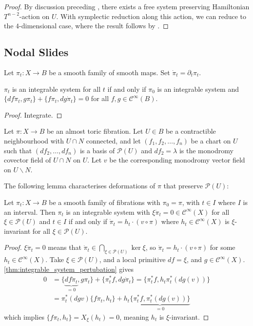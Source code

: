 \documentclass[12pt,a4paper,abstract=true,draft]{scrartcl}
\begin{document}
\begin{proof}
  By discussion preceding \cite[Definition 5.3]{Zun96}, there exists a free system preserving Hamiltonian $T^{n-2}$-action on $U$.
  With symplectic reduction along this action, we can reduce to the $4$-dimensional case, where the result follows by \cite[Lemma 1]{Zun97}.
\end{proof}

\subsection{Nodal Slides}

Let $π_t \colon X → B$ be a smooth family of smooth maps.
Set $\dot{π}_t = ∂_t π_t$.
\begin{lemma}
  \label{thm:integrable_system_pertubation}
  $π_t$ is an integrable system for all $t$ if and only if $π_0$ is an integrable system and $\{df \dot{π}_t,gπ_t\} + \{f π_t, dg \dot{π}_t\} = 0$ for all $f,g ∈ 𝒞^∞(B)$.
\end{lemma}
\begin{proof}
  Integrate.
\end{proof}

Let $π\colon X → B$ be an almost toric fibration.
Let $U ∈ B$ be a contractible neighbourhood with $U ∩ N$ connected, and let $(f_1,f_2,…,f_n)$ be a chart on $U$ such that $(df_2,…,df_n)$ is a basis of $𝒫(U)$ and $df_2 = λ$ is the monodromy covector field of $U ∩ N$ on $U$.
Let $v$ be the corresponding monodromy vector field on $U ∖ N$.

The following lemma characterises deformations of $π$ that preserve $𝒫(U)$:
\begin{lemma}
  Let $π_t \colon X → B$ be a smooth family of fibrations with $π_0=π$, with $t ∈ I$ where $I$ is an interval.
  Then $π_t$ is an integrable system with $ξ\dot{π}_t = 0 ∈ 𝒞^∞(X)$ for all $ξ ∈ 𝒫(U)$ and $t ∈ I$ if and only if $\dot{π}_t = h_t ·(v∘π)$ where $h_t ∈ 𝒞^∞(X)$ is $ξ$-invariant for all $ξ ∈ 𝒫(U)$.
\end{lemma}
\begin{proof}
  $ξ \dot{π}_t = 0$ means that $\dot{π}_t ∈ ⋂_{ξ ∈ 𝒫(U)} \ker ξ$, so $\dot{π}_t = h_t · (v ∘ π)$ for some $h_t ∈ 𝒞^∞(X)$.
  Take $ξ ∈ 𝒫(U)$, and a local primitive $df = ξ$, and $g ∈ 𝒞^∞(X)$. \cref{thm:integrable_system_pertubation} gives
  \begin{align*}
    0 &= \{\underbrace{df \dot{π}_t}_{=0}, g π_t\} + \{π_t^* f,dg \dot{π}_t\} = \{π_t^* f, h_t π_t^*(dg(v))\} \\
      &= π_t^*(dg v)\{fπ_t, h_t\} + h_t \underbrace{\{π_t^* f,π_t^* (dg(v))\}}_{=0}
  \end{align*}
  which implies $\{fπ_t,h_t\} = X_ξ(h_t) = 0$, meaning $h_t$ is $ξ$-invariant.
\end{proof}
\end{document}
